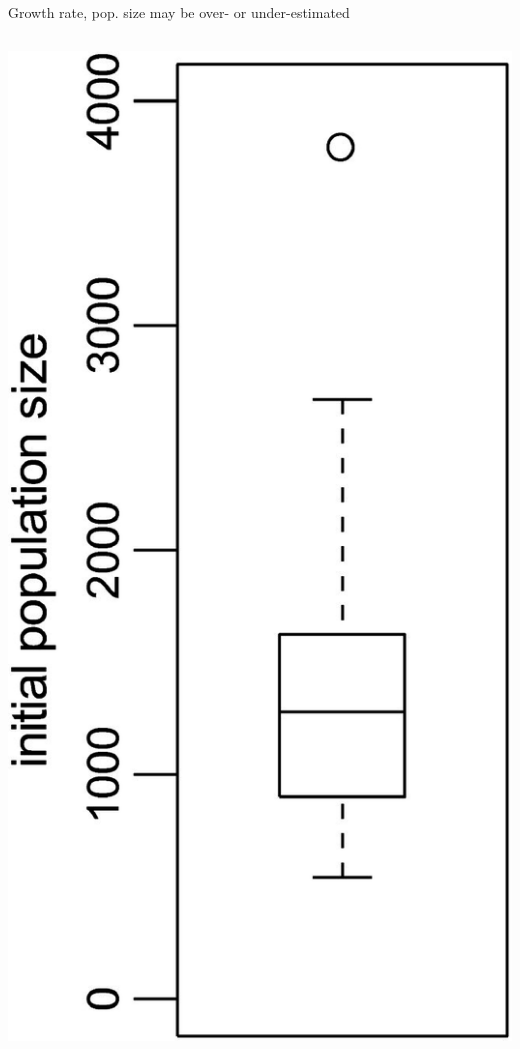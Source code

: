 \documentclass{beamer}
\begin{document}
\begin{frame}{Growth rate, pop. size may be over- or under-estimated}
  \begin{columns}
    \begin{column}{0.2\textwidth}
      \includegraphics[width=\textwidth]{F6}
    \end{column}

\end{columns}
\end{frame}
\end{document}
